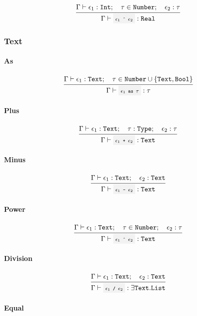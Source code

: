 \[
	\infrule{
		\EnvSym\then \expr_1:\Int \semiq \tau \in \Number \semiq \expr_2:\tau
	}{
		\EnvSym\then \code{$\expr_1$ \^{} $\expr_2$} : \Real
	}
\]

\subsubsection{Text}

\paragraph{As}

\[
	\infrule{
		\EnvSym\then \expr_1:\Text \semiq \tau \in \Number \cup \set{\Text, \Bool}
	}{
		\EnvSym\then \code{$\expr_1$ as $\tau$}: \tau
	}
\]

\paragraph{Plus}

\[
	\infrule{
		\EnvSym\then \expr_1:\Text \semiq \tau:\Type \semiq \expr_2:\tau
	}{
		\EnvSym\then \code{$\expr_1$ + $\expr_2$}: \Text
	}
\]

\paragraph{Minus}

\[
	\infrule{
		\EnvSym\then \expr_1:\Text \semiq \expr_2:\Text
	}{
		\EnvSym\then \code{$\expr_1$ - $\expr_2$}: \Text
	}
\]

\paragraph{Power}

\[
	\infrule{
		\EnvSym\then \expr_1:\Text \semiq \tau \in \Number \semiq \expr_2:\tau
	}{
		\EnvSym\then \code{$\expr_1$ \^{} $\expr_2$}: \Text
	}
\]


\paragraph{Division}

\[
	\infrule{
		\EnvSym\then \expr_1:\Text \semiq \expr_2:\Text
	}{
		\EnvSym\then \code{$\expr_1$ / $\expr_2$}: \exists\Text.\List
	}
\]

\paragraph{Equal}

